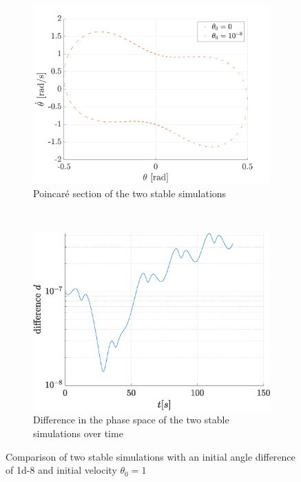 \documentclass[a4paper,12pt,twoside]{article}
\begin{document}
\begin{figure}[h]
\centering
	\begin{subfigure}[t]{0.47\textwidth}
		\includegraphics[width=\textwidth]{graphs/e_sens_notchaos.png}
		\caption{Poincaré section of the two stable simulations}
		\label{fig:e-sens-notchaos}
	\end{subfigure}
	~
	\begin{subfigure}[t]{0.45\textwidth}
		\includegraphics[width=\textwidth]{graphs/e_lyap_notchaos.eps}
		\caption{Difference in the phase space of the two stable simulations over time}
		\label{fig:e-lyap-notchaos}
	\end{subfigure}
	\caption{Comparison of two stable simulations with an initial angle difference of \num{1d-8} and initial velocity $\theta_0 = 1$}
	\label{fig:e-notchaos}
\end{figure}
\end{document}
